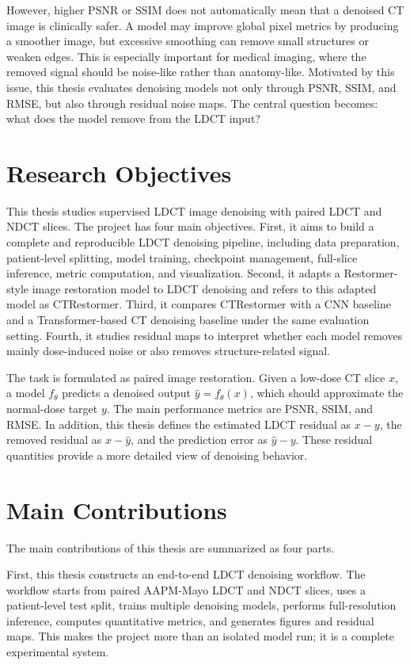 However, higher PSNR or SSIM does not automatically mean that a denoised CT image is clinically safer. A model may improve global pixel metrics by producing a smoother image, but excessive smoothing can remove small structures or weaken edges. This is especially important for medical imaging, where the removed signal should be noise-like rather than anatomy-like. Motivated by this issue, this thesis evaluates denoising models not only through PSNR, SSIM, and RMSE, but also through residual noise maps. The central question becomes: what does the model remove from the LDCT input?

\section{Research Objectives}

This thesis studies supervised LDCT image denoising with paired LDCT and NDCT slices. The project has four main objectives. First, it aims to build a complete and reproducible LDCT denoising pipeline, including data preparation, patient-level splitting, model training, checkpoint management, full-slice inference, metric computation, and visualization. Second, it adapts a Restormer-style image restoration model to LDCT denoising and refers to this adapted model as CTRestormer. Third, it compares CTRestormer with a CNN baseline and a Transformer-based CT denoising baseline under the same evaluation setting. Fourth, it studies residual maps to interpret whether each model removes mainly dose-induced noise or also removes structure-related signal.

The task is formulated as paired image restoration. Given a low-dose CT slice \(x\), a model \(f_{\theta}\) predicts a denoised output \(\hat{y}=f_{\theta}(x)\), which should approximate the normal-dose target \(y\). The main performance metrics are PSNR, SSIM, and RMSE. In addition, this thesis defines the estimated LDCT residual as \(x-y\), the removed residual as \(x-\hat{y}\), and the prediction error as \(\hat{y}-y\). These residual quantities provide a more detailed view of denoising behavior.

\section{Main Contributions}

The main contributions of this thesis are summarized as four parts.

First, this thesis constructs an end-to-end LDCT denoising workflow. The workflow starts from paired AAPM-Mayo LDCT and NDCT slices, uses a patient-level test split, trains multiple denoising models, performs full-resolution inference, computes quantitative metrics, and generates figures and residual maps. This makes the project more than an isolated model run; it is a complete experimental system.

